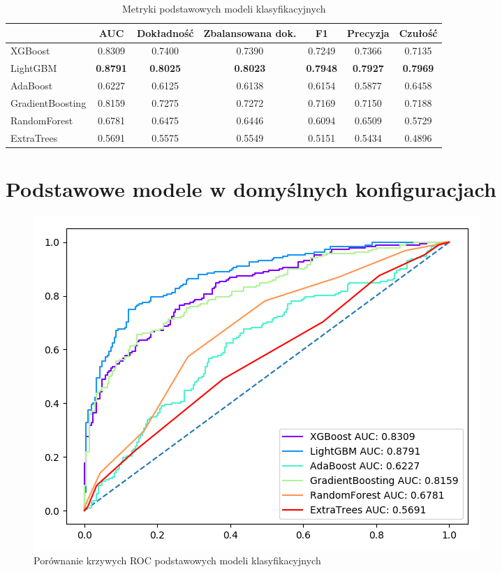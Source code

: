 \documentclass[a4paper,12pt]{article}
\begin{document}
    \begin{table}
        \hspace*{-1cm}
        \begin{tabular}{l|*{6}{c}}
            & AUC & Dokładność & Zbalansowana dok. & F1 & Precyzja & Czułość \\
            \hline
            XGBoost & 0.8309 & 0.7400 & 0.7390 & 0.7249 & 0.7366 & 0.7135 \\
            LightGBM & \textbf{0.8791} & \textbf{0.8025} & \textbf{0.8023} & \textbf{0.7948} & \textbf{0.7927} & \textbf{0.7969} \\
            AdaBoost & 0.6227 & 0.6125 & 0.6138 & 0.6154 & 0.5877 & 0.6458 \\
            GradientBoosting & 0.8159 & 0.7275 & 0.7272 & 0.7169 & 0.7150 & 0.7188 \\
            RandomForest & 0.6781 & 0.6475 & 0.6446 & 0.6094 & 0.6509 & 0.5729 \\
            ExtraTrees & 0.5691 & 0.5575 & 0.5549 & 0.5151 & 0.5434 & 0.4896 \\
        \end{tabular}
        \hspace*{1cm}
        \caption{Metryki podstawowych modeli klasyfikacyjnych}
        \label{tab:score-comparison}
    \end{table}

    \section{Podstawowe modele w domyślnych konfiguracjach}

    \begin{figure}
        \centering
        \includegraphics[width=\linewidth]{../images/roc-comparison.png}
        \caption{Porównanie krzywych ROC podstawowych modeli klasyfikacyjnych}
        \label{fig:roc-comparison}
    \end{figure}
\end{document}
